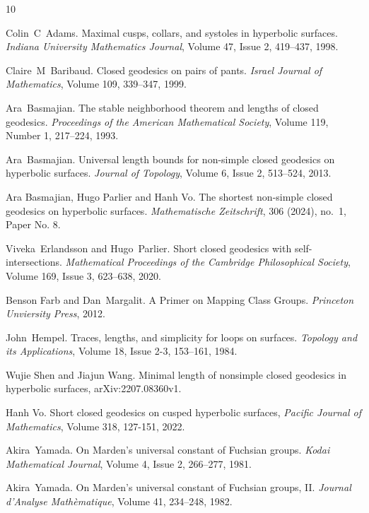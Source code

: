 \documentclass[11pt, a4paper]{article}
\theoremstyle{definition}
\theoremstyle{remark}
\begin{document}
\begin{thebibliography}{10}

 Colin~C~Adams.
 \newblock Maximal cusps, collars, and systoles in hyperbolic surfaces. 
 \newblock \emph{Indiana University Mathematics Journal}, Volume 47, Issue 2, 419--437, 1998.

 Claire~M~Baribaud.
 \newblock Closed geodesics on pairs of pants. 
 \newblock \emph{Israel Journal of Mathematics}, Volume 109, 339--347, 1999.

 Ara~Basmajian.
 \newblock The stable neighborhood theorem and lengths of closed geodesics.
 \newblock \emph{Proceedings of the American Mathematical Society}, Volume 119, Number 1, 217--224, 1993.

 Ara~Basmajian. 
 \newblock Universal length bounds for non-simple closed geodesics on hyperbolic surfaces. 
 \newblock \emph{Journal of Topology}, Volume 6, Issue 2, 513--524, 2013.

 Ara Basmajian, Hugo Parlier and Hanh Vo. 
 \newblock The shortest non-simple closed geodesics on hyperbolic surfaces. 
 \newblock \emph{Mathematische Zeitschrift}, {306} (2024), no.~1, Paper No. 8.

 Viveka~Erlandsson and Hugo~Parlier.
 \newblock Short closed geodesics with self-intersections. 
 \newblock \emph{Mathematical Proceedings of the Cambridge Philosophical Society}, Volume 169, Issue 3, 623--638, 2020.

 Benson Farb and Dan~Margalit.
 \newblock A Primer on Mapping Class Groups.
 \newblock \emph{Princeton Unviersity Press}, 2012.

 John~Hempel.
 \newblock Traces, lengths, and simplicity for loops on surfaces.
 \newblock \emph{Topology and its Applications}, Volume 18, Issue 2-3, 153--161, 1984.

 Wujie Shen and Jiajun Wang.
 \newblock Minimal length of nonsimple closed geodesics in hyperbolic surfaces,
 \newblock arXiv:2207.08360v1.

 Hanh Vo.
\newblock Short closed geodesics on cusped hyperbolic surfaces,
\newblock \emph{Pacific Journal of Mathematics}, Volume 318, 127-151, 2022.

 Akira~Yamada.
 \newblock On Marden's universal constant of Fuchsian groups. 
 \newblock \emph{Kodai Mathematical Journal}, Volume 4, Issue 2, 266--277, 1981.

 Akira~Yamada.
 \newblock On Marden's universal constant of Fuchsian groups, II. 
 \newblock \emph{Journal d’Analyse Math\`ematique}, Volume 41, 234--248, 1982.







\end{thebibliography}
\end{document}

